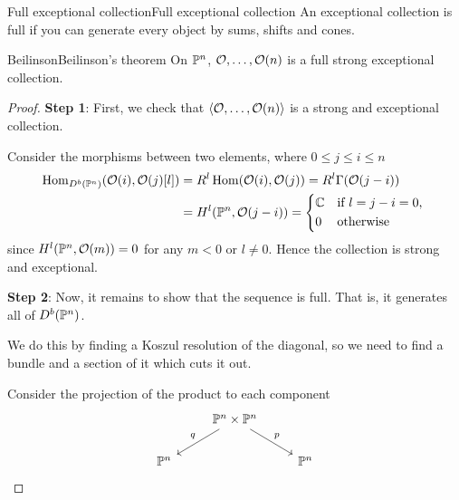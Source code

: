 \begin{definition}{Full exceptional collection}{Full exceptional collection}
    An exceptional collection is full if you can generate every object by sums, shifts and cones.
\end{definition}

\begin{theorem}{Beilinson}{Beilinson's theorem}
    On $\P^n$, $\O,\dots,\O(n)$ is a full strong exceptional collection.
\end{theorem}

\begin{proof}
    \textbf{Step 1}:
    First, we check that $\langle\O,\dots,\O(n)\rangle$ is a strong and exceptional collection.

    Consider the morphisms between two elements, where $0\leq j\leq i \leq n$
    \begin{align*}
        \Hom_{D^b(\P^n)}(\O(i),\O(j)[l])
            &= R^l\Hom(\O(i),\O(j))
            = R^l\Gamma(\O(j-i)) \\
            &= H^l(\P^n,\O(j-i))
            = \begin{cases*}
                \C & if $l=j-i=0$, \\
                0 & otherwise
            \end{cases*}
    \end{align*}
    since $H^{l}(\P^n,\O(m))=0$ for any $m<0$ or $l \neq 0$. Hence the collection is strong and exceptional.

    \textbf{Step 2}:
    Now, it remains to show that the sequence is full. That is, it generates all of $D^b(\P^n)$.

    We do this by finding a Koszul resolution of the diagonal, so we need to find a bundle and a section of it which cuts it out.

    Consider the projection of the product to each component
    \begin{equation*}
        \begin{tikzcd}
            & \P^n\times\P^n \ar[dl,"q"'] \ar[dr,"p"] \\
            \P^n & & \P^n
        \end{tikzcd}
    \end{equation*}


\end{proof}
